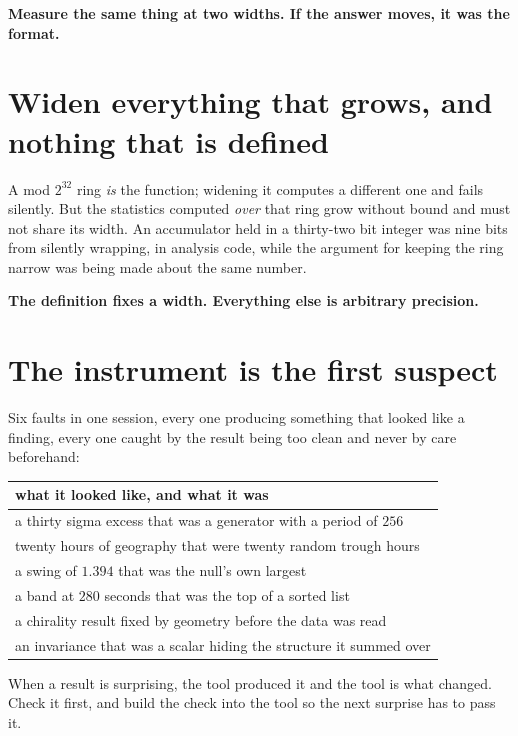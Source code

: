 \textbf{Measure the same thing at two widths. If the answer moves, it was the format.}

\section{Widen everything that grows, and nothing that is defined}

A mod \(2^{32}\) ring \emph{is} the function; widening it computes a different one and fails silently. But the statistics computed \emph{over} that ring grow without bound and must not share its width. An accumulator held in a thirty-two bit integer was nine bits from silently wrapping, in analysis code, while the argument for keeping the ring narrow was being made about the same number.

\textbf{The definition fixes a width. Everything else is arbitrary precision.}

\section{The instrument is the first suspect}

Six faults in one session, every one producing something that looked like a finding, every one caught by the result being too clean and never by care beforehand:

\begin{center}
\begin{tabular}{@{}l@{}}
\toprule
what it looked like, and what it was \\
\midrule
a thirty sigma excess that was a generator with a period of \(256\) \\
twenty hours of geography that were twenty random trough hours \\
a swing of \(1.394\) that was the null's own largest \\
a band at \(280\) seconds that was the top of a sorted list \\
a chirality result fixed by geometry before the data was read \\
an invariance that was a scalar hiding the structure it summed over \\
\bottomrule
\end{tabular}
\end{center}

When a result is surprising, the tool produced it and the tool is what changed. Check it first, and build the check into the tool so the next surprise has to pass it.

